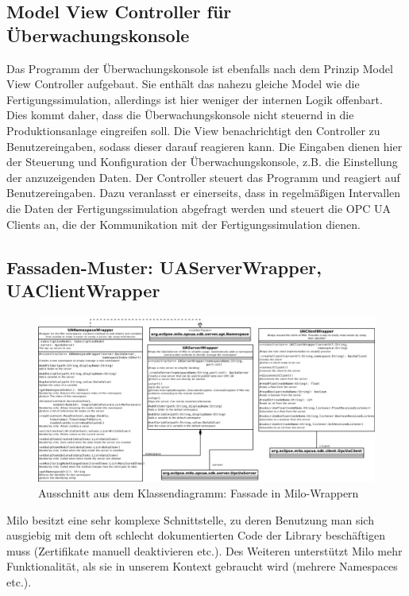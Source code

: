 \documentclass[parskip=full]{scrartcl}
\begin{document}
\subsection{Model View Controller f\"ur \"Uberwachungskonsole}
Das Programm der \"Uberwachungskonsole ist ebenfalls nach dem Prinzip Model View Controller aufgebaut.
Sie enth\"alt das nahezu gleiche Model wie die Fertigungssimulation, allerdings ist hier weniger der internen Logik offenbart. Dies kommt daher, dass
die \"Uberwachungskonsole nicht steuernd in die Produktionsanlage eingreifen soll.
Die View benachrichtigt den Controller zu Benutzereingaben, sodass dieser darauf reagieren kann. Die Eingaben dienen hier der Steuerung und Konfiguration
der \"Uberwachungskonsole, z.B. die Einstellung der anzuzeigenden Daten.
Der Controller steuert das Programm und reagiert auf Benutzereingaben. Dazu veranlasst er einerseits, dass in regelm\"a{\ss}igen Intervallen die Daten der
Fertigungssimulation abgefragt werden und steuert die OPC UA Clients an, die der Kommunikation mit der Fertigungssimulation dienen.

\pagebreak
\subsection{Fassaden-Muster: UAServerWrapper, UAClientWrapper}
\begin{figure}[H]
  \centering
  \includegraphics[scale=0.3]{design/pattern-screenshots/fascade-UAWrapper.png}
  \caption{Ausschnitt aus dem Klassendiagramm: Fassade in Milo-Wrappern}
\end{figure}
Milo besitzt eine sehr komplexe Schnittstelle, zu deren Benutzung man sich ausgiebig mit dem oft schlecht dokumentierten Code
der Library beschäftigen muss (Zertifikate manuell deaktivieren etc.). Des Weiteren unterstützt Milo mehr Funktionalität,
als sie in unserem Kontext gebraucht wird (mehrere Namespaces etc.).
\end{document}
